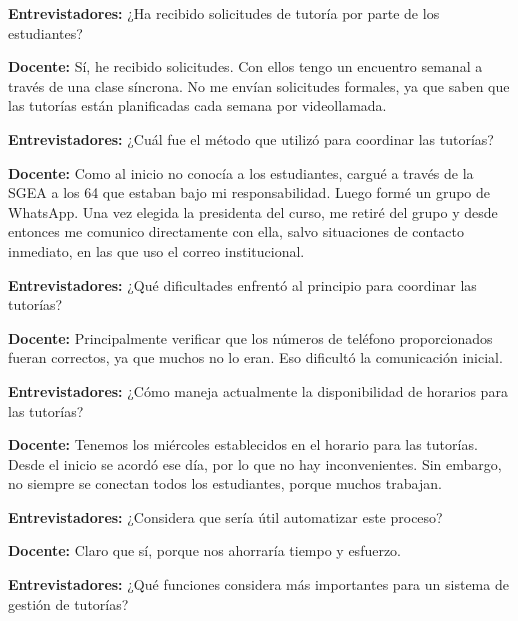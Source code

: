 \noindent\textbf{Entrevistadores:} ¿Ha recibido solicitudes de tutoría por parte de los estudiantes?\par\smallskip

\noindent\textbf{Docente:} Sí, he recibido solicitudes. Con ellos tengo un encuentro semanal a través de una clase síncrona. No me envían solicitudes formales, ya que saben que las tutorías están planificadas cada semana por videollamada.\par\smallskip

\noindent\textbf{Entrevistadores:} ¿Cuál fue el método que utilizó para coordinar las tutorías?\par\smallskip

\noindent\textbf{Docente:} Como al inicio no conocía a los estudiantes, cargué a través de la SGEA a los 64 que estaban bajo mi responsabilidad. Luego formé un grupo de WhatsApp. Una vez elegida la presidenta del curso, me retiré del grupo y desde entonces me comunico directamente con ella, salvo situaciones de contacto inmediato, en las que uso el correo institucional.\par\smallskip

\noindent\textbf{Entrevistadores:} ¿Qué dificultades enfrentó al principio para coordinar las tutorías?\par\smallskip

\noindent\textbf{Docente:} Principalmente verificar que los números de teléfono proporcionados fueran correctos, ya que muchos no lo eran. Eso dificultó la comunicación inicial.\par\smallskip

\noindent\textbf{Entrevistadores:} ¿Cómo maneja actualmente la disponibilidad de horarios para las tutorías?\par\smallskip

\noindent\textbf{Docente:} Tenemos los miércoles establecidos en el horario para las tutorías. Desde el inicio se acordó ese día, por lo que no hay inconvenientes. Sin embargo, no siempre se conectan todos los estudiantes, porque muchos trabajan.\par\smallskip

\noindent\textbf{Entrevistadores:} ¿Considera que sería útil automatizar este proceso?\par\smallskip

\noindent\textbf{Docente:} Claro que sí, porque nos ahorraría tiempo y esfuerzo.\par\smallskip

\noindent\textbf{Entrevistadores:} ¿Qué funciones considera más importantes para un sistema de gestión de tutorías?\par\smallskip

